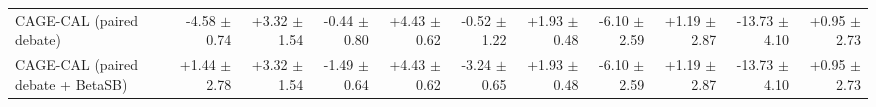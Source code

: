 \begin{tabular}{lrrrrrrrrrr}
CAGE-CAL (paired debate) & -4.58 {\scriptsize $\pm$ 0.74} & +3.32 {\scriptsize $\pm$ 1.54} & -0.44 {\scriptsize $\pm$ 0.80} & +4.43 {\scriptsize $\pm$ 0.62} & -0.52 {\scriptsize $\pm$ 1.22} & +1.93 {\scriptsize $\pm$ 0.48} & -6.10 {\scriptsize $\pm$ 2.59} & +1.19 {\scriptsize $\pm$ 2.87} & -13.73 {\scriptsize $\pm$ 4.10} & +0.95 {\scriptsize $\pm$ 2.73} \\
CAGE-CAL (paired debate + BetaSB) & +1.44 {\scriptsize $\pm$ 2.78} & +3.32 {\scriptsize $\pm$ 1.54} & -1.49 {\scriptsize $\pm$ 0.64} & +4.43 {\scriptsize $\pm$ 0.62} & -3.24 {\scriptsize $\pm$ 0.65} & +1.93 {\scriptsize $\pm$ 0.48} & -6.10 {\scriptsize $\pm$ 2.59} & +1.19 {\scriptsize $\pm$ 2.87} & -13.73 {\scriptsize $\pm$ 4.10} & +0.95 {\scriptsize $\pm$ 2.73} \\
\bottomrule
\end{tabular}
